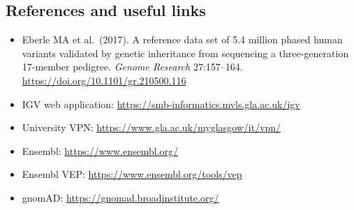 \documentclass[
  letterpaper,
  DIV=11,
  numbers=noendperiod]{scrreprt}
\providecommand{\tightlist}{%
  \setlength{\itemsep}{0pt}\setlength{\parskip}{0pt}}
\begin{document}
\begin{tcolorbox}

\chapter{References and useful links}\label{references-and-useful-links}

\begin{itemize}
\tightlist
\item
  Eberle MA et al.~(2017). A reference data set of 5.4 million phased
  human variants validated by genetic inheritance from sequencing a
  three-generation 17-member pedigree. \emph{Genome Research}
  27:157--164. \url{https://doi.org/10.1101/gr.210500.116}
\item
  IGV web application: \url{https://smb-informatics.mvls.gla.ac.uk/igv}
\item
  University VPN: \url{https://www.gla.ac.uk/myglasgow/it/vpn/}
\item
  Ensembl: \url{https://www.ensembl.org/}
\item
  Ensembl VEP: \url{https://www.ensembl.org/tools/vep}
\item
  gnomAD: \url{https://gnomad.broadinstitute.org/}
\end{itemize}

\end{tcolorbox}
\end{document}
